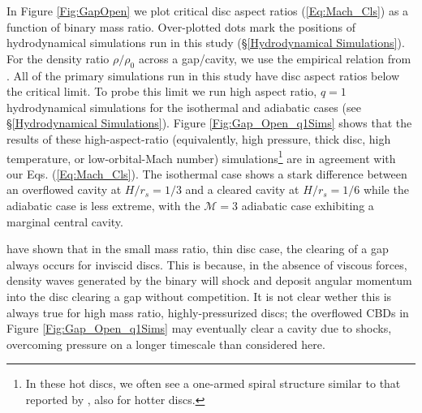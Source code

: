 \documentclass[usenatbib]{mnras}
\def\Mach{\mathcal{M}}
\begin{document}
In Figure \ref{Fig:GapOpen} we plot critical disc aspect ratios
(\ref{Eq:Mach_Cls}) as a function of binary mass ratio. Over-plotted dots mark
the positions of hydrodynamical simulations run in this study (\S \ref{Hydrodynamical Simulations}). For the density ratio
$\rho/\rho_0$ across a gap/cavity, we use the empirical relation from
\cite{DuffellMac:2013:smallqGapOpen}. All of the primary simulations run in 
this study have disc aspect ratios below the critical limit. 
To probe this limit we run high aspect ratio, $q=1$ hydrodynamical simulations for the
isothermal and adiabatic cases (see \S \ref{Hydrodynamical Simulations}). 
Figure \ref{Fig:Gap_Open_q1Sims} shows that the results of
these high-aspect-ratio (equivalently, high pressure, thick disc, high temperature,
or low-orbital-Mach number) simulations\footnote{In these hot discs, we often see a one-armed spiral structure similar to that reported by \cite{ShiKrolik:2015}, also for hotter discs.} are in agreement with our
Eqs. (\ref{Eq:Mach_Cls}). The isothermal case shows a stark difference between an
overflowed cavity at $H/r_s=1/3$ and a cleared cavity at $H/r_s=1/6$ while the 
adiabatic case is less extreme, with the $\Mach=3$ adiabatic case exhibiting a marginal central cavity.


\cite{DuffellMac:2013:smallqGapOpen} have shown that in the small mass ratio, thin disc case, the clearing of a gap always occurs for inviscid discs. This is because, in the absence of viscous forces, density waves generated by the binary will shock and deposit angular momentum into the disc clearing a gap without competition. It is not clear wether this is always true for high mass ratio, highly-pressurized discs; the overflowed CBDs in Figure \ref{Fig:Gap_Open_q1Sims} may eventually clear a cavity due to shocks, overcoming pressure on a longer timescale than considered here. 
\end{document}
